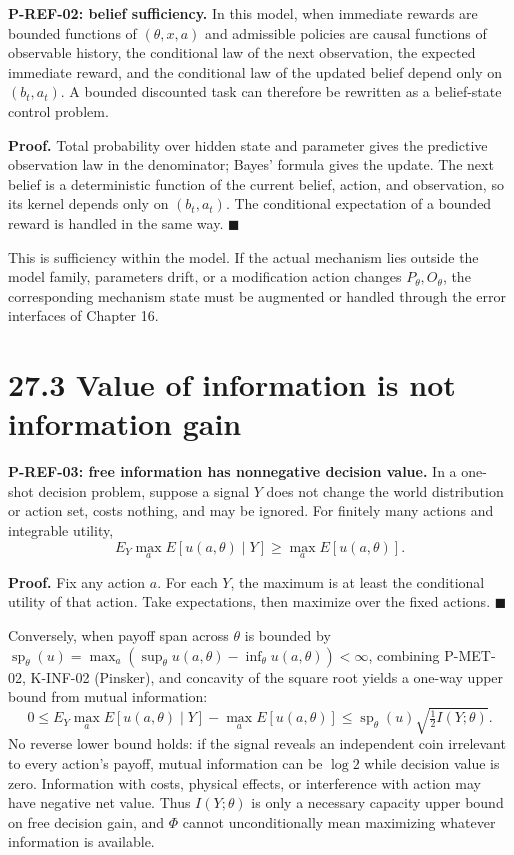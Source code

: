 \documentclass[
  english,
  11pt,
  oneside]{book}
\begin{document}
\hypertarget{p-ref-02}{}\label{p-ref-02}

\textbf{P-REF-02: belief sufficiency.} In this model, when immediate rewards are bounded functions of \((\theta,x,a)\) and admissible policies are causal functions of observable history, the conditional law of the next observation, the expected immediate reward, and the conditional law of the updated belief depend only on \((b_t,a_t)\). A bounded discounted task can therefore be rewritten as a belief-state control problem.

\textbf{Proof.} Total probability over hidden state and parameter gives the predictive observation law in the denominator; Bayes' formula gives the update. The next belief is a deterministic function of the current belief, action, and observation, so its kernel depends only on \((b_t,a_t)\). The conditional expectation of a bounded reward is handled in the same way. \(\blacksquare\)

This is sufficiency within the model. If the actual mechanism lies outside the model family, parameters drift, or a modification action changes \(P_\theta,O_\theta\), the corresponding mechanism state must be augmented or handled through the error interfaces of Chapter 16.

\section{27.3 Value of information is not information gain}\label{value-of-information-is-not-information-gain}

\hypertarget{p-ref-03}{}\label{p-ref-03}

\textbf{P-REF-03: free information has nonnegative decision value.} In a one-shot decision problem, suppose a signal \(Y\) does not change the world distribution or action set, costs nothing, and may be ignored. For finitely many actions and integrable utility, \[E_Y\max_a E[u(a,\theta)\mid Y]
\ge \max_a E[u(a,\theta)].\]

\textbf{Proof.} Fix any action \(a\). For each \(Y\), the maximum is at least the conditional utility of that action. Take expectations, then maximize over the fixed actions. \(\blacksquare\)

Conversely, when payoff span across \(\theta\) is bounded by \(\operatorname{sp}_\theta(u)=\max_a(\sup_\theta u(a,\theta)-\inf_\theta u(a,\theta))<\infty\), combining P-MET-02, K-INF-02 (Pinsker), and concavity of the square root yields a one-way upper bound from mutual information: \[0\le E_Y\max_a E[u(a,\theta)\mid Y]-\max_a E[u(a,\theta)]
\le\operatorname{sp}_\theta(u)\sqrt{\tfrac12 I(Y;\theta)}.\] No reverse lower bound holds: if the signal reveals an independent coin irrelevant to every action's payoff, mutual information can be \(\log2\) while decision value is zero. Information with costs, physical effects, or interference with action may have negative net value. Thus \(I(Y;\theta)\) is only a necessary capacity upper bound on free decision gain, and \(\Phi\) cannot unconditionally mean maximizing whatever information is available.
\end{document}
